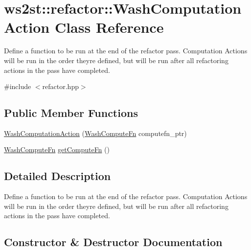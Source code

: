 \hypertarget{classws2st_1_1refactor_1_1WashComputationAction}{}\section{ws2st\+:\+:refactor\+:\+:Wash\+Computation\+Action Class Reference}
\label{classws2st_1_1refactor_1_1WashComputationAction}


Define a function to be run at the end of the refactor pass. Computation Actions will be run in the order they\textquotesingle{}re defined, but will be run after all refactoring actions in the pass have completed.  




{\ttfamily \#include $<$refactor.\+hpp$>$}

\subsection*{Public Member Functions}
\begin{DoxyCompactItemize}
\item 
\mbox{\hyperlink{classws2st_1_1refactor_1_1WashComputationAction_a5371af5f19e07759f4863e7b6011e787}{Wash\+Computation\+Action}} (\mbox{\hyperlink{namespacews2st_a77544d74f310dc9ec5c11bffa3ea77b6}{Wash\+Compute\+Fn}} computefn\+\_\+ptr)
\item 
\mbox{\hyperlink{namespacews2st_a77544d74f310dc9ec5c11bffa3ea77b6}{Wash\+Compute\+Fn}} \mbox{\hyperlink{classws2st_1_1refactor_1_1WashComputationAction_a195edd152f7fd88ca90d6dc7fb4897dc}{get\+Compute\+Fn}} ()
\end{DoxyCompactItemize}


\subsection{Detailed Description}
Define a function to be run at the end of the refactor pass. Computation Actions will be run in the order they\textquotesingle{}re defined, but will be run after all refactoring actions in the pass have completed. 

\subsection{Constructor \& Destructor Documentation}
\mbox{\label{classws2st_1_1refactor_1_1WashComputationAction_a5371af5f19e07759f4863e7b6011e787}} 
